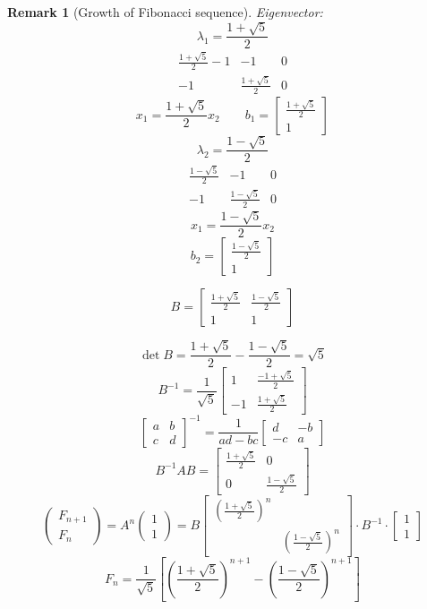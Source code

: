 \documentclass{article}
\newtheorem{remark}{Remark}  \numberwithin{remark}{section}
\newcommand{\vectwo}[2]{\begin{pmatrix} #1 \\ #2 \end{pmatrix}}
\begin{document}
\begin{remark}[Growth of Fibonacci sequence]
  Eigenvector:
  \[ \lambda_1 = \frac{1 + \sqrt5}{2} \]
  \[
    \begin{array}{cc|c}
      \frac{1 + \sqrt5}{2} - 1 & -1 & 0 \\
      -1 & \frac{1 + \sqrt5}{2} & 0
    \end{array}
  \] \[
    x_1 = \frac{1 + \sqrt5}{2} x_2 \qquad b_1 = \begin{bmatrix} \frac{1 + \sqrt5}{2} \\ 1 \end{bmatrix}
  \] \[
    \lambda_2 = \frac{1 - \sqrt5}{2}
  \] \[
    \begin{array}{cc|c}
      \frac{1 - \sqrt5}{2} & -1 & 0 \\
      -1 & \frac{1 - \sqrt5}{2} & 0
    \end{array}
  \]
  \[ x_1 = \frac{1 - \sqrt5}{2} x_2 \]
  \[ b_2 = \begin{bmatrix} \frac{1 - \sqrt5}{2} \\ 1 \end{bmatrix} \]

  \[ B = \begin{bmatrix} \frac{1 + \sqrt5}{2} & \frac{1 - \sqrt5}{2} \\ 1 & 1 \end{bmatrix} \]

  \[ \det{B} = \frac{1 + \sqrt5}{2} - \frac{1 - \sqrt5}{2} = \sqrt5 \]
  \[ B^{-1} = \frac{1}{\sqrt5} \begin{bmatrix} 1 & \frac{-1 + \sqrt5}{2} \\ -1 & \frac{1 + \sqrt5}{2} \end{bmatrix} \]
  \[ \begin{bmatrix} a & b \\ c & d \end{bmatrix}^{-1} = \frac{1}{ad - bc} \begin{bmatrix} d & -b \\ -c & a \end{bmatrix} \]
  \[ B^{-1} AB = \begin{bmatrix} \frac{1 + \sqrt5}{2} & 0 \\ 0 & \frac{1 - \sqrt5}{2} \end{bmatrix} \]
  \[ \vectwo{F_{n+1}}{F_n} = A^n \vectwo11 = B \begin{bmatrix} (\frac{1 + \sqrt5}{2})^n & \\ & (\frac{1 - \sqrt5}{2})^n \end{bmatrix} \cdot B^{-1} \cdot \begin{bmatrix} 1 \\ 1\end{bmatrix} \]
  \[ F_n = \frac1{\sqrt5} \left[\left(\frac{1 + \sqrt5}{2}\right)^{n+1} - \left(\frac{1 - \sqrt5}{2}\right)^{n+1}\right] \]


\end{remark}
\end{document}
